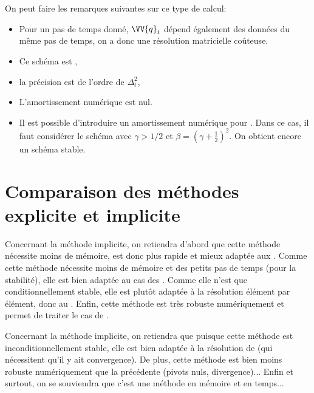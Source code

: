 \medskip
On peut faire les remarques suivantes sur ce type de calcul:
\begin{itemize}
   \item Pour un pas de temps donné, $\VV{q}_t$ dépend également des données du même pas de temps,
	on a donc une résolution matricielle coûteuse.
   \item Ce schéma est , 
   \item la précision est de l'ordre de $\Delta_t^2$, 
   \item L'amortissement numérique est nul.
   \item Il est possible d'introduire un amortissement numérique pour . Dans ce cas, il faut considérer le schéma avec $\gamma>1/2$ et
	$\beta=(\gamma+\frac12)^2$. On obtient encore un schéma stable.
\end{itemize}




\bigskip
\section{Comparaison des méthodes explicite et implicite}

\medskip
Concernant la méthode implicite, on retiendra d'abord que cette méthode nécessite moins de mémoire, est donc plus
	rapide et mieux adaptée aux .
Comme cette méthode nécessite moins de mémoire et des petits pas de temps (pour la stabilité),
	elle est bien adaptée au cas des .
Comme elle n'est que conditionnellement stable, elle est plutôt adaptée à la résolution élément
	par élément, donc au .
Enfin, cette méthode est très robuste numériquement et permet de traiter le cas de .


\medskip
Concernant la méthode implicite, on retiendra que puisque cette méthode est inconditionnellement stable, elle est bien adaptée à la résolution
	de  (qui nécessitent qu'il y ait convergence).
De plus, cette méthode est bien moins robuste numériquement que la précédente (pivots nuls,
	divergence)...
Enfin et surtout, on se souviendra que c'est une méthode  en
	mémoire et en temps...

